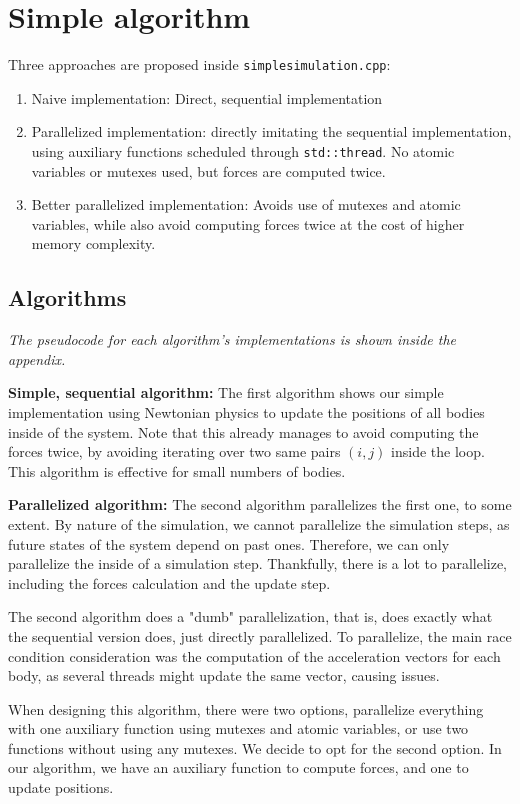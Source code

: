 \documentclass{article}
\begin{document}
\section{Simple algorithm}

Three approaches are proposed inside \texttt{simplesimulation.cpp}:
\begin{enumerate}
   \item Naive implementation: Direct, sequential implementation
   \item Parallelized implementation: directly imitating the sequential implementation, using auxiliary functions scheduled through \texttt{std::thread}. No atomic variables or mutexes used, but forces are computed twice.
   \item Better parallelized implementation: Avoids use of mutexes and atomic variables, while also avoid computing forces twice at the cost of higher memory complexity.
\end{enumerate}

\subsection{Algorithms}

\textit{The pseudocode for each algorithm's implementations is shown inside the appendix.}

\textbf{Simple, sequential algorithm:}
The first algorithm shows our simple implementation using Newtonian physics to update the positions of all bodies inside of the system. Note that this already manages to avoid computing the forces twice, by avoiding iterating over two same pairs $(i,j)$ inside the loop. This algorithm is effective for small numbers of bodies.


\textbf{Parallelized algorithm:}
The second algorithm parallelizes the first one, to some extent. By nature of the simulation, we cannot parallelize the simulation steps, as future states of the system depend on past ones. Therefore, we can only parallelize the inside of a simulation step. Thankfully, there is a lot to parallelize, including the forces calculation and the update step.

The second algorithm does a "dumb" parallelization, that is, does exactly what the sequential version does, just directly parallelized. To parallelize, the main race condition consideration was the computation of the acceleration vectors for each body, as several threads might update the same vector, causing issues.

When designing this algorithm, there were two options, parallelize everything with one auxiliary function using mutexes and atomic variables, or use two functions without using any mutexes. We decide to opt for the second option. In our algorithm, we have an auxiliary function to compute forces, and one to update positions.
\end{document}
